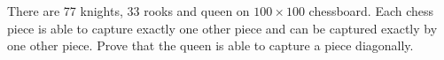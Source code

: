 \problem
There are 77 knights, 33 rooks and queen on $100 \times 100$ chessboard.
Each chess piece is able to capture exactly one other piece and can be captured
exactly by one other piece.
Prove that the queen is able to capture a piece diagonally.

\solution

\endproblem
